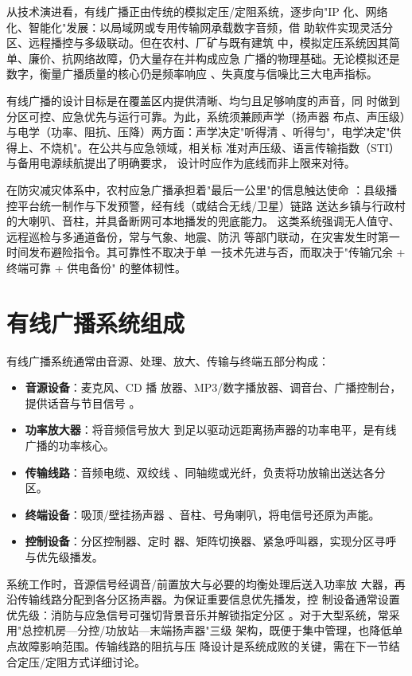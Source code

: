 从技术演进看，有线广播正由传统的模拟定压/定阻系统，逐步向"IP
 化、网络化、智能化"发展：以局域网或专用传输网承载数字音频，借
助软件实现灵活分区、远程播控与多级联动。但在农村、厂矿与既有建筑
中，模拟定压系统因其简单、廉价、抗网络故障，仍大量存在并构成应急
广播的物理基础。无论模拟还是数字，衡量广播质量的核心仍是频率响应
、失真度与信噪比三大电声指标。

有线广播的设计目标是在覆盖区内提供清晰、均匀且足够响度的声音，同
时做到分区可控、应急优先与运行可靠。为此，系统须兼顾声学（扬声器
布点、声压级）与电学（功率、阻抗、压降）两方面：声学决定"听得清
、听得匀"，电学决定"供得上、不烧机"。在公共与应急领域，相关标
准对声压级、语言传输指数（STI）与备用电源续航提出了明确要求，
设计时应作为底线而非上限来对待。

在防灾减灾体系中，农村应急广播承担着"最后一公里"的信息触达使命
：县级播控平台统一制作与下发预警，经有线（或结合无线/卫星）链路
送达乡镇与行政村的大喇叭、音柱，并具备断网可本地播发的兜底能力。
这类系统强调无人值守、远程巡检与多通道备份，常与气象、地震、防汛
等部门联动，在灾害发生时第一时间发布避险指令。其可靠性不取决于单
一技术先进与否，而取决于"传输冗余 + 终端可靠 + 供电备份"
的整体韧性。

\section{有线广播系统组成}
\label{sec:wired_broadcast_components}

有线广播系统通常由音源、处理、放大、传输与终端五部分构成：

\begin{itemize}
    \item \textbf{音源设备}：麦克风、CD 播
放器、MP3/数字播放器、调音台、广播控制台，提供话音与节目信号
。
    \item \textbf{功率放大器}：将音频信号放大
到足以驱动远距离扬声器的功率电平，是有线广播的功率核心。
    \item \textbf{传输线路}：音频电缆、双绞线
、同轴缆或光纤，负责将功放输出送达各分区。
    \item \textbf{终端设备}：吸顶/壁挂扬声器
、音柱、号角喇叭，将电信号还原为声能。
    \item \textbf{控制设备}：分区控制器、定时
器、矩阵切换器、紧急呼叫器，实现分区寻呼与优先级播发。
\end{itemize}

系统工作时，音源信号经调音/前置放大与必要的均衡处理后送入功率放
大器，再沿传输线路分配到各分区扬声器。为保证重要信息优先播发，控
制设备通常设置优先级：消防与应急信号可强切背景音乐并解锁指定分区
。对于大型系统，常采用"总控机房—分控/功放站—末端扬声器"三级
架构，既便于集中管理，也降低单点故障影响范围。传输线路的阻抗与压
降设计是系统成败的关键，需在下一节结合定压/定阻方式详细讨论。


